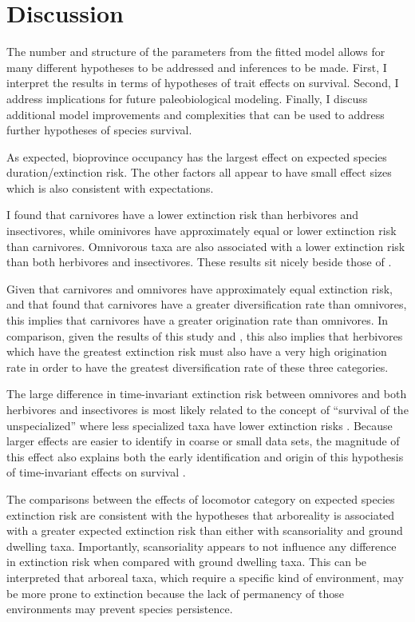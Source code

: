 \documentclass[12pt,letterpaper]{article}
\begin{document}
\section{Discussion}

The number and structure of the parameters from the fitted model allows for many different hypotheses to be addressed and inferences to be made. First, I interpret the results in terms of hypotheses of trait effects on survival. Second, I address implications for future paleobiological modeling. Finally, I discuss additional model improvements and complexities that can be used to address further hypotheses of species survival.

As expected, bioprovince occupancy has the largest effect on expected species duration/extinction risk. The other factors all appear to have small effect sizes which is also consistent with expectations.

I found that carnivores have a lower extinction risk than herbivores and insectivores, while ominivores have approximately equal or lower extinction risk than carnivores. Omnivorous taxa are also associated with a lower extinction risk than both herbivores and insectivores. These results sit nicely beside those of \citet{Price2012}.

Given that carnivores and omnivores have approximately equal extinction risk, and that \citet{Price2012} found that carnivores have a greater diversification rate than omnivores, this implies that carnivores have a greater origination rate than omnivores. In comparison, given the results of this study and \citet{Price2012}, this also implies that herbivores which have the greatest extinction risk must also have a very high origination rate in order to have the greatest diversification rate of these three categories. 

The large difference in time-invariant extinction risk between omnivores and both herbivores and insectivores is most likely related to the concept of ``survival of the unspecialized'' where less specialized taxa have lower extinction risks \citep{Liow2004a,Simpson1944}. Because larger effects are easier to identify in coarse or small data sets, the magnitude of this effect also explains both the early identification and origin of this hypothesis of time-invariant effects on survival \citep{Simpson1944}.

The comparisons between the effects of locomotor category on expected species extinction risk are consistent with the hypotheses that arboreality is associated with a greater expected extinction risk than either with scansoriality and ground dwelling taxa. Importantly, scansoriality appears to not influence any difference in extinction risk when compared with ground dwelling taxa. This can be interpreted that arboreal taxa, which require a specific kind of environment, may be more prone to extinction because the lack of permanency of those environments may prevent species persistence. 
\end{document}
